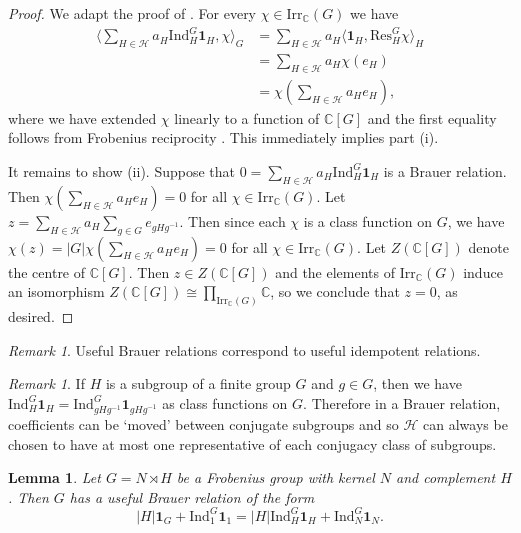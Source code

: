 \documentclass[12pt]{amsart}
\theoremstyle{plain}
\newtheorem{lemma}[theorem]{Lemma}
\theoremstyle{remark}
\newtheorem{remark}[theorem]{Remark}
\theoremstyle{definition}
\newcommand{\C}{\mathbb{C}}
\newcommand{\Res}{\mathrm{Res}}
\newcommand{\Ind}{\mathrm{Ind}}
\newcommand{\Irr}{\mathrm{Irr}}
\numberwithin{equation}{section}
\begin{document}
\begin{proof}
We adapt the proof of \cite[\S 3]{MR1000113}.
For every $\chi \in \Irr_{\C}(G)$ we have
\begin{align*}
\textstyle{\langle \sum_{H \in \mathcal{H}} a_{H} \Ind_{H}^{G} \mathbf{1}_{H},\chi \rangle_{G}}
&= \textstyle{\sum_{H \in \mathcal{H}} a_{H} 
\langle  \mathbf{1}_{H}, \Res^{G}_{H} \chi \rangle_{H}} \\
&= \textstyle{\sum_{H \in \mathcal{H}} a_{H} \chi(e_{H})} \\
&= \textstyle{\chi (\sum_{H\in\mathcal{H}}a_{H}e_{H} )} ,
\end{align*}
where we have extended $\chi$ linearly to a function of $\C[G]$ and 
the first equality follows from Frobenius reciprocity \cite[(10.9)]{MR632548}.
This immediately implies part (i). 

It remains to show (ii). 
Suppose that $0=\sum_{H \in \mathcal{H}} a_{H} \Ind_{H}^{G} \mathbf{1}_{H}$ is a Brauer relation.
Then $\chi(\sum_{H \in \mathcal{H}} a_{H} e_{H})=0$ for all $\chi \in \Irr_{\C}(G)$. 
Let $z=\sum_{H \in \mathcal{H}} a_{H} \sum_{g \in G} e_{gHg^{-1}}$.
Then since each $\chi$ is a class function on $G$, we have 
$\chi(z)=|G|\chi(\sum_{H \in \mathcal{H}} a_{H} e_{H}) =0$ for all $\chi \in \Irr_{\C}(G)$.
Let $Z(\C[G])$ denote the centre of $\C[G]$.
Then $z \in Z(\C[G])$ and the elements of $\Irr_{\C}(G)$ induce an isomorphism $Z(\C[G]) \cong \prod_{\Irr_{\C}(G)} \C$, so we conclude that $z=0$, as desired.
\end{proof}

\begin{remark}\label{rmk:useful-corr-useful}
Useful Brauer relations correspond to useful idempotent relations. 
\end{remark}

\begin{remark}\label{rmk:coefficients-conj-subgroups}
If $H$ is a subgroup of a finite group $G$ and $g \in G$, then we have 
$\Ind^{G}_{H} \mathbf{1}_{H} = \Ind^{G}_{gHg^{-1}} \mathbf{1}_{gHg^{-1}}$ as class functions on $G$. 
Therefore in a Brauer relation, coefficients can be `moved' between conjugate subgroups
and so $\mathcal{H}$ can always be chosen to have at most one representative of each conjugacy class of subgroups.
\end{remark}

\begin{lemma}\label{lem:frob-brauer}
Let $G = N \rtimes H$ be a Frobenius group with kernel $N$ and complement $H$.
Then $G$ has a useful Brauer relation of the form
\[
|H|\mathbf{1}_{G} + \Ind_{1}^{G} \mathbf{1}_{1}
= |H|\Ind^{G}_{H} \mathbf{1}_{H} + \Ind_{N}^{G} \mathbf{1}_{N}.
\]  
\end{lemma}
\end{document}
